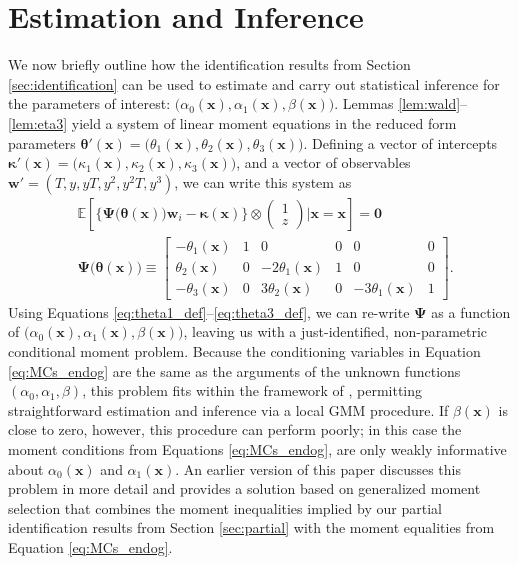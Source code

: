 \section{Estimation and Inference}
\label{sec:inference}
We now briefly outline how the identification results from Section \ref{sec:identification} can be used to estimate and carry out statistical inference for the parameters of interest: $\big(\alpha_0(\mathbf{x}), \alpha_1(\mathbf{x}), \beta(\mathbf{x})\big)$.
Lemmas \ref{lem:wald}--\ref{lem:eta3} yield a system of linear moment equations in the reduced form parameters $\boldsymbol{\theta}'(\mathbf{x}) = \big(\theta_1(\mathbf{x}), \theta_2(\mathbf{x}),\theta_3(\mathbf{x})\big)$.
Defining a vector of intercepts $\boldsymbol{\kappa}'(\mathbf{x}) = \big(\kappa_1(\mathbf{x}), \kappa_2(\mathbf{x}), \kappa_3(\mathbf{x})\big)$,
and a vector of observables $\mathbf{w}' = (T, y, yT, y^2, y^2 T, y^3)$, we can write this system as
\begin{align}
&\mathbb{E}\left[
  \bigg\{\boldsymbol{\Psi}\big(\boldsymbol{\theta}(\mathbf{x})\big)\mathbf{w}_i - \boldsymbol{\kappa}(\mathbf{x})\bigg\} \otimes 
\left(
\begin{array}{c}
  1 \\ z
\end{array}\right)\Bigg| \mathbf{x} = \boldsymbol{x}
\right] = \mathbf{0}
\label{eq:MCs_endog}\\
  &\boldsymbol{\Psi}\big(\boldsymbol{\theta}(\mathbf{x})\big) \equiv 
  \left[
  \begin{array}{rrrrrr}
    -\theta_1(\mathbf{x}) & 1 & 0 & 0 & 0 & 0\\
    \theta_2(\mathbf{x}) & 0 & -2\theta_1(\mathbf{x}) & 1 & 0 & 0\\ 
    -\theta_3(\mathbf{x}) & 0 & 3\theta_2(\mathbf{x}) & 0 & -3\theta_1(\mathbf{x}) & 1
\end{array}\right].
\end{align}
Using Equations \ref{eq:theta1_def}--\ref{eq:theta3_def}, we can re-write  $\mathbf{\Psi}$ as a function of $\big(\alpha_0(\mathbf{x}), \alpha_1(\mathbf{x}), \beta(\mathbf{x})\big)$, leaving us with a just-identified, non-parametric conditional moment problem.
Because the conditioning variables in Equation \ref{eq:MCs_endog} are the same as the arguments of the unknown functions $(\alpha_0, \alpha_1, \beta)$, this problem fits within the framework of \cite{Lewbel2007}, permitting straightforward estimation and inference via a local GMM procedure. 
If $\beta(\mathbf{x})$ is close to zero, however, this procedure can perform poorly; in this case the moment conditions from Equations \ref{eq:MCs_endog}, are only weakly informative about $\alpha_0(\mathbf{x})$ and $\alpha_1(\mathbf{x})$.
An earlier version of this paper \citep{DiTragliaGarciaWP2017} discusses this problem in more detail and provides a solution based on generalized moment selection \citep{AndrewsSoares} that combines the moment inequalities implied by our partial identification results from Section \ref{sec:partial} with the moment equalities from Equation \ref{eq:MCs_endog}.
